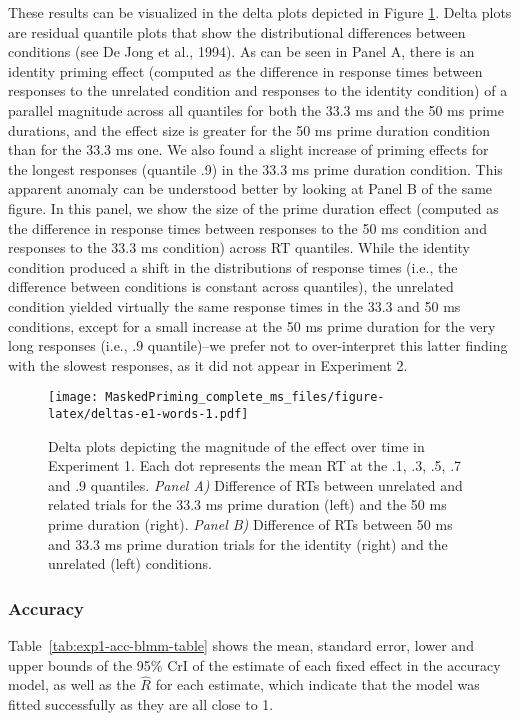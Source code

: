 \documentclass[
  english,
  man,floatsintext]{apa6}
\begin{document}
These results can be visualized in the delta plots depicted in Figure \ref{fig:deltas-e1-words}. Delta plots are residual quantile plots that show the distributional differences between conditions (see De Jong et al., 1994). As can be seen in Panel A, there is an identity priming effect (computed as the difference in response times between responses to the unrelated condition and responses to the identity condition) of a parallel magnitude across all quantiles for both the 33.3 ms and the 50 ms prime durations, and the effect size is greater for the 50 ms prime duration condition than for the 33.3 ms one. We also found a slight increase of priming effects for the longest responses (quantile .9) in the 33.3 ms prime duration condition. This apparent anomaly can be understood better by looking at Panel B of the same figure. In this panel, we show the size of the prime duration effect (computed as the difference in response times between responses to the 50 ms condition and responses to the 33.3 ms condition) across RT quantiles. While the identity condition produced a shift in the distributions of response times (i.e., the difference between conditions is constant across quantiles), the unrelated condition yielded virtually the same response times in the 33.3 and 50 ms conditions, except for a small increase at the 50 ms prime duration for the very long responses (i.e., .9 quantile)--we prefer not to over-interpret this latter finding with the slowest responses, as it did not appear in Experiment 2.

\begin{figure}
\centering
\texttt{[image: MaskedPriming\_complete\_ms\_files/figure-latex/deltas-e1-words-1.pdf]}
\caption{\label{fig:deltas-e1-words}Delta plots depicting the magnitude of the effect over time in Experiment 1. Each dot represents the mean RT at the .1, .3, .5, .7 and .9 quantiles. \emph{Panel A)} Difference of RTs between unrelated and related trials for the 33.3 ms prime duration (left) and the 50 ms prime duration (right). \emph{Panel B)} Difference of RTs between 50 ms and 33.3 ms prime duration trials for the identity (right) and the unrelated (left) conditions.}
\end{figure}

\hypertarget{accuracy}{%
\subsubsection{Accuracy}\label{accuracy}}

Table~\ref{tab:exp1-acc-blmm-table} shows the mean, standard error, lower and upper bounds of the 95\% CrI of the estimate of each fixed effect in the accuracy model, as well as the \(\hat{R}\) for each estimate, which indicate that the model was fitted successfully as they are all close to 1.
\end{document}
